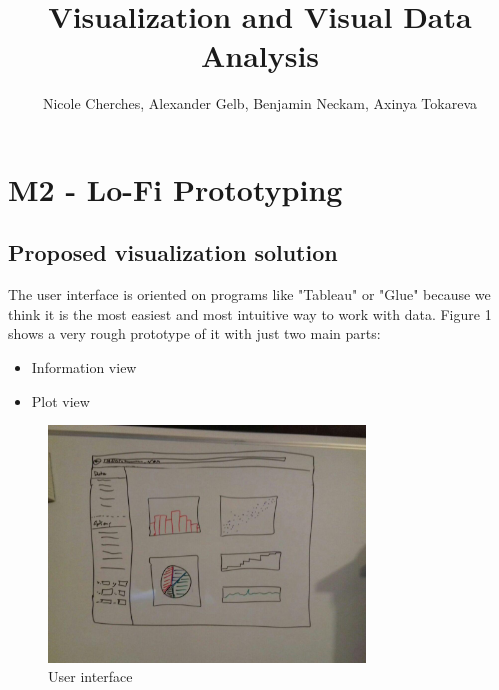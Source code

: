 \documentclass{article}
\begin{document}
\title{Visualization and Visual Data Analysis}
\author{Nicole Cherches, Alexander Gelb, Benjamin Neckam, Axinya Tokareva}
\maketitle
\section{M2 - Lo-Fi Prototyping}
\subsection{Proposed visualization solution}
The user interface is oriented on programs like "Tableau" or "Glue" because we think it is the most easiest and most intuitive way to work with data. Figure 1 shows a very rough prototype of it with just two main parts:\\
\begin{itemize}
\item Information view
\item Plot view
\end{itemize}

\begin{figure}[!h]
\centering
    \includegraphics[width=0.75\textwidth]{images/Prototype1.jpg}
	\caption{User interface}
	\label{fig1}
\end{figure}
\end{document}

